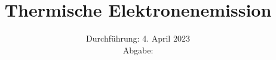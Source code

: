 

\subject{\texorpdfstring{\vspace{2ex}}{}V504\texorpdfstring{\vspace{-2ex}}{}} %
\title{Thermische Elektronenemission} %
\date{
	Durchführung: 4. April 2023 %
	\\ Abgabe:%
}




\maketitle
\thispagestyle{empty}


\tableofcontents
\newpage







\printbibliography{}

\newpage




